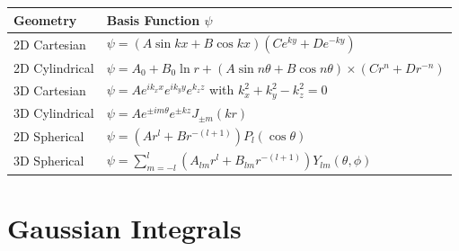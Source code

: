 \renewcommand{\thefootnote}{\fnsymbol{footnote}}

\begin{table}[h!]
  \centering
  \begin{tabular}{ l l}
    \hline
    Geometry \T\B& Basis Function $\psi$\\ 
    \hline\hline
    2D Cartesian \T& $\psi = \left( A \sin kx + B \cos kx \right) \left( C e^{ky} + D e^{-ky} \right) $ \\[5pt]
    2D Cylindrical & $\psi = A_{0} + B_{0} \ln r + \left( A \sin n \theta + B \cos n \theta \right) \times \left( C r^{n} + D r^{-n} \right)$ \\[5pt]
    3D Cartesian   & $\psi = A e^ {ik_{x} x} e^{i k_{y} y} e^{k_{z} z} $ with $k_{x}^{2} + k_{y}^{2} - k_{z}^{2} = 0$ \\[5pt]
    3D Cylindrical & $\psi = A e^{ \pm i m \theta} e^{\pm k z} J_{\pm m}(kr)$ \footnotemark[1] \\[5pt]
    2D Spherical   & $\psi = \left( A r^{l} + B r^{-(l+1)} \right) P_{l}(\cos \theta)$\\[5pt]
    3D Spherical \B& $\psi = \sum\limits_{m=-l}^{l} \left( A_{lm} r^{l} + B_{lm} r^{-(l+1)} \right) Y_{lm}(\theta, \phi)$\footnotemark[2] \\[5pt]
    \hline
\end{tabular}
\end{table}



\renewcommand{\thefootnote}{\arabic{footnote}}

\section{Gaussian Integrals } %

